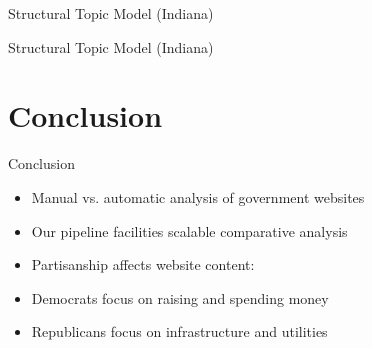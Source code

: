 \documentclass[12pt]{beamer}
\begin{document}
\begin{frame}{Structural Topic Model (Indiana)}
\end{frame}

\begin{frame}{Structural Topic Model (Indiana)}
\end{frame}

\section{Conclusion}
\begin{frame}{Conclusion}
\linespread{1.5}
\large
\begin{itemize}
	\item Manual vs. automatic analysis of government websites
	\item Our pipeline facilities scalable comparative analysis
	
	\vspace{5mm}
	\item Partisanship affects website content:
	\item Democrats focus on raising and spending money
	\item Republicans focus on infrastructure and utilities
\end{itemize}
\end{frame}
\end{document}
